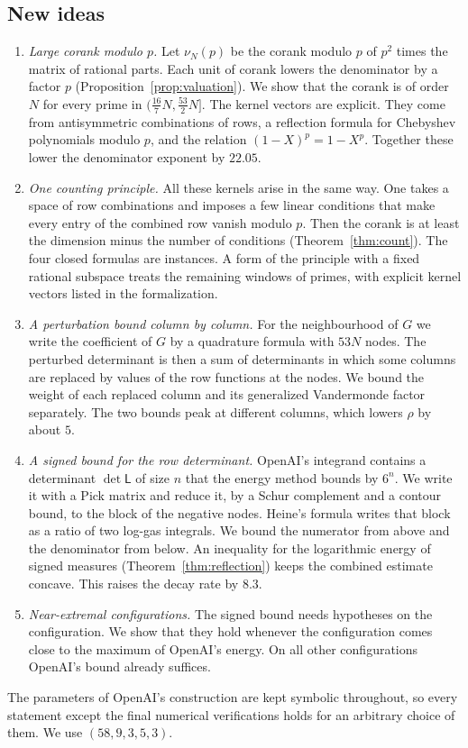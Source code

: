 \documentclass[11pt]{amsart}
\theoremstyle{definition}
\theoremstyle{remark}
\numberwithin{equation}{section}
\begin{document}
\subsection{New ideas}\label{sec:intro-ideas}
\begin{enumerate}[label=\arabic*.,wide]
\item \emph{Large corank modulo $p$.} Let $\nu_N(p)$ be the corank modulo $p$ of $p^2$ times the matrix of
rational parts. Each unit of corank lowers the denominator by a factor $p$
(Proposition~\ref{prop:valuation}). We show that the corank is of order $N$ for every prime in
$(\frac{16}7N,\frac{53}2N]$. The kernel vectors are explicit. They come from antisymmetric combinations of
rows, a reflection formula for Chebyshev polynomials modulo $p$, and the relation $(1-X)^p=1-X^p$.
Together these lower the denominator exponent by $22.05$.

\item \emph{One counting principle.} All these kernels arise in the same way. One takes a space of row
combinations and imposes a few linear conditions that make every entry of the combined row vanish modulo
$p$. Then the corank is at least the dimension minus the number of conditions (Theorem~\ref{thm:count}).
The four closed formulas are instances. A form of the principle with a fixed rational subspace treats the
remaining windows of primes, with explicit kernel vectors listed in the formalization.

\item \emph{A perturbation bound column by column.} For the neighbourhood of $G$ we write the coefficient of
$G$ by a quadrature formula with $53N$ nodes. The perturbed determinant is then a sum of determinants in
which some columns are replaced by values of the row functions at the nodes. We bound the weight of each
replaced column and its generalized Vandermonde factor separately. The two bounds peak at different
columns, which lowers $\rho$ by about $5$.

\item \emph{A signed bound for the row determinant.} OpenAI's integrand contains a determinant $\det\mathsf L$
of size $n$ that the energy method bounds by $6^n$. We write it with a Pick matrix and reduce it, by a Schur
complement and a contour bound, to the block of the negative nodes. Heine's formula writes that block as a
ratio of two log-gas integrals. We bound the numerator from above and the denominator from below. An
inequality for the logarithmic energy of signed measures (Theorem~\ref{thm:reflection}) keeps the combined
estimate concave. This raises the decay rate by $8.3$.

\item \emph{Near-extremal configurations.} The signed bound needs hypotheses on the configuration. We show
that they hold whenever the configuration comes close to the maximum of OpenAI's energy. On all other
configurations OpenAI's bound already suffices.
\end{enumerate}
The parameters of OpenAI's construction are kept symbolic throughout, so every statement except the final
numerical verifications holds for an arbitrary choice of them. We use $(58,9,3,5,3)$.
\end{document}
